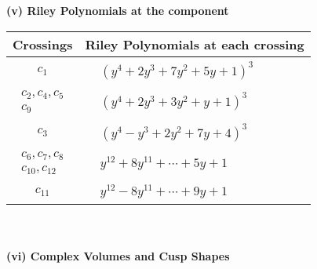 \documentclass[1p]{elsarticle_modified}
\theoremstyle{definition}
\begin{document}
\newpage\renewcommand{\arraystretch}{1}
\flushleft \textbf{(v) Riley Polynomials at the component}\newline \\
\begin{tabular}{m{50pt}|m{274pt}}
Crossings & \hspace{64pt}Riley Polynomials at each crossing \\
\hline $$\begin{aligned}c_{1}\end{aligned}$$&$\begin{aligned}
&(y^4+2 y^3+7 y^2+5 y+1)^3
\end{aligned}$\\
\hline $$\begin{aligned}c_{2},c_{4},c_{5}\\c_{9}\end{aligned}$$&$\begin{aligned}
&(y^4+2 y^3+3 y^2+y+1)^3
\end{aligned}$\\
\hline $$\begin{aligned}c_{3}\end{aligned}$$&$\begin{aligned}
&(y^4- y^3+2 y^2+7 y+4)^3
\end{aligned}$\\
\hline $$\begin{aligned}c_{6},c_{7},c_{8}\\c_{10},c_{12}\end{aligned}$$&$\begin{aligned}
&y^{12}+8 y^{11}+\cdots+5 y+1
\end{aligned}$\\
\hline $$\begin{aligned}c_{11}\end{aligned}$$&$\begin{aligned}
&y^{12}-8 y^{11}+\cdots+9 y+1
\end{aligned}$\\
\hline
\end{tabular}\\~\\
\newpage\flushleft \textbf{(vi) Complex Volumes and Cusp Shapes}
\end{document}
